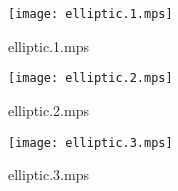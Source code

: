 \documentclass[letterpaper,10pt]{article}
\begin{document}
\begin{figure}
    \centering
    \texttt{[image: elliptic.1.mps]}
    \caption{elliptic.1.mps}
\end{figure}

\begin{figure}
    \centering
    \texttt{[image: elliptic.2.mps]}
    \caption{elliptic.2.mps}
\end{figure}

\begin{figure}
    \centering
    \texttt{[image: elliptic.3.mps]}
    \caption{elliptic.3.mps}
\end{figure}
\end{document}
